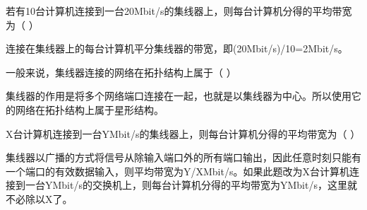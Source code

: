 \question 若有10台计算机连接到一台20Mbit/s的集线器上，则每台计算机分得的平均带宽为（
）
\par{}
\begin{solution}连接在集线器上的每台计算机平分集线器的带宽，即(20Mbit/s)/10=2Mbit/s。
\end{solution}
\question 一般来说，集线器连接的网络在拓扑结构上属于（ ）
\par{}
\begin{solution}集线器的作用是将多个网络端口连接在一起，也就是以集线器为中心。所以使用它的网络在拓扑结构上属于星形结构。
\end{solution}
\question X台计算机连接到一台YMbit/s的集线器上，则每台计算机分得的平均带宽为（ ）
\par{}
\begin{solution}集线器以广播的方式将信号从除输入端口外的所有端口输出，因此任意时刻只能有一个端口的有效数据输入，则平均带宽为Y/XMbit/s。如果此题改为X台计算机连接到一台YMbit/s的交换机上，则每台计算机分得的平均带宽为YMbit/s，这里就不必除以X了。
\end{solution}
